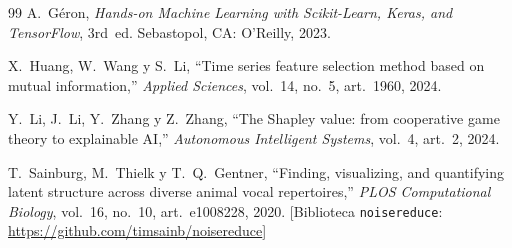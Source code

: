 \documentclass[10pt,twocolumn]{article}
\begin{document}
\begin{thebibliography}{99}
A.~Géron, \textit{Hands-on Machine Learning with Scikit-Learn, Keras,
and TensorFlow}, 3rd~ed. Sebastopol, CA: O'Reilly, 2023.

X.~Huang, W.~Wang y S.~Li, ``Time series feature selection method based
on mutual information,'' \textit{Applied Sciences}, vol.~14, no.~5,
art.~1960, 2024.

Y.~Li, J.~Li, Y.~Zhang y Z.~Zhang, ``The Shapley value: from
cooperative game theory to explainable AI,'' \textit{Autonomous
Intelligent Systems}, vol.~4, art.~2, 2024.

T.~Sainburg, M.~Thielk y T.~Q.~Gentner, ``Finding, visualizing, and
quantifying latent structure across diverse animal vocal repertoires,''
\textit{PLOS Computational Biology}, vol.~16, no.~10, art.~e1008228,
2020. [Biblioteca \texttt{noisereduce}: \url{https://github.com/timsainb/noisereduce}]

\end{thebibliography}
\end{document}
